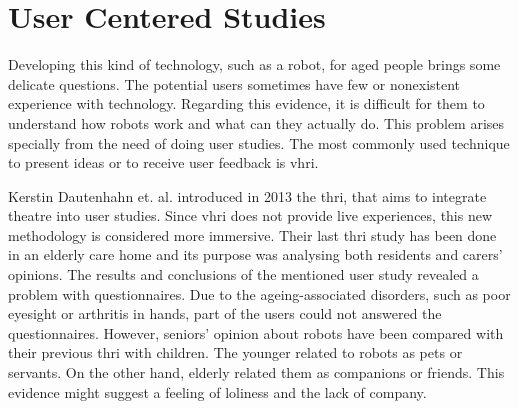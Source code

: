 \section{User Centered Studies} \label{userstudies}

Developing this kind of technology, such as a robot, for aged people brings some delicate questions.
The potential users sometimes have few or nonexistent experience with technology.
Regarding this evidence, it is difficult for them to understand how robots work and what can they actually do.
This problem arises specially from the need of doing user studies.
The most commonly used technique to present ideas or to receive user feedback is \gls{vhri}.

Kerstin Dautenhahn  et. al. introduced in 2013 the \gls{thri}, that aims to integrate theatre into user studies.
Since \gls{vhri} does not provide live experiences, this new methodology is considered more immersive.
Their last \gls{thri} study has been done in an elderly care home and its purpose was analysing both residents and carers' opinions.
The results and conclusions of the mentioned user study revealed a problem with questionnaires.
Due to the ageing-associated disorders, such as poor eyesight or arthritis in hands, part of the users could not answered the questionnaires.
However, seniors' opinion about robots have been compared with their previous \gls{thri} with children.
The younger related to robots as pets or servants.
On the other hand, elderly related them as companions or friends.
This evidence might suggest a feeling of loliness and the lack of company.


